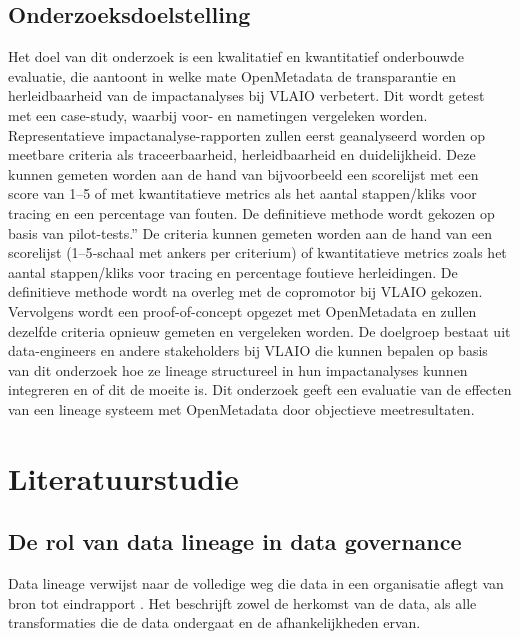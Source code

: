 \subsection{Onderzoeksdoelstelling}

Het doel van dit onderzoek is een kwalitatief en kwantitatief onderbouwde evaluatie, die aantoont in welke mate OpenMetadata de transparantie en herleidbaarheid van de impactanalyses bij VLAIO verbetert. Dit wordt getest met een case-study, waarbij voor- en nametingen vergeleken worden. Representatieve impactanalyse-rapporten zullen eerst geanalyseerd worden op meetbare criteria als traceerbaarheid, herleidbaarheid en duidelijkheid. Deze kunnen gemeten worden aan de hand van bijvoorbeeld een scorelijst met een score van 1–5 of met kwantitatieve metrics als het aantal stappen/kliks voor tracing en een percentage van fouten.
De definitieve methode wordt gekozen op basis van pilot-tests.”
De criteria kunnen gemeten worden aan de hand van een scorelijst (1–5‑schaal met ankers per criterium) of kwantitatieve metrics zoals het aantal stappen/kliks voor tracing en percentage foutieve herleidingen. De definitieve methode wordt na overleg met de copromotor bij VLAIO gekozen.
Vervolgens wordt een proof-of-concept opgezet met OpenMetadata en zullen dezelfde criteria opnieuw gemeten en vergeleken worden. De doelgroep bestaat uit data-engineers en andere stakeholders bij VLAIO die kunnen bepalen op basis van dit onderzoek hoe ze lineage structureel in hun impactanalyses kunnen integreren en of dit de moeite is. Dit onderzoek geeft een evaluatie van de effecten van een lineage systeem met OpenMetadata door objectieve meetresultaten.


\section{Literatuurstudie}%
\label{sec:literatuurstudie}

\subsection{De rol van data lineage in data governance}

Data lineage verwijst naar de volledige weg die data in een organisatie aflegt van bron tot eindrapport \autocite{VLAIO}. Het beschrijft zowel de herkomst van de data, als alle transformaties die de data ondergaat en de afhankelijkheden ervan.

